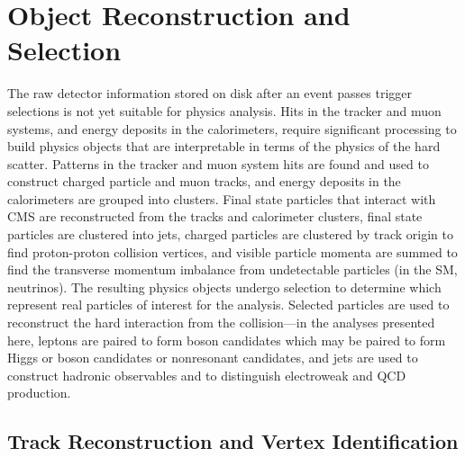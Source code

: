 
\chapter{Object Reconstruction and Selection}

The raw detector information stored on disk after an event passes trigger selections is not yet suitable for physics analysis.
Hits in the tracker and muon systems, and energy deposits in the calorimeters, require significant processing to build physics objects that are interpretable in terms of the physics of the hard scatter.
Patterns in the tracker and muon system hits are found and used to construct charged particle and muon tracks, and energy deposits in the calorimeters are grouped into clusters.
Final state particles that interact with CMS are reconstructed from the tracks and calorimeter clusters, final state particles are clustered into jets, charged particles are clustered by track origin to find proton-proton collision vertices, and visible particle momenta are summed to find the transverse momentum imbalance from undetectable particles (in the SM, neutrinos).
The resulting physics objects undergo selection to determine which represent real particles of interest for the analysis.
Selected particles are used to reconstruct the hard interaction from the collision---in the analyses presented here, leptons are paired to form {\Zgs} boson candidates which may be paired to form Higgs or {\PZ} boson candidates or nonresonant {\ZZ} candidates, and jets are used to construct hadronic observables and to distinguish electroweak and QCD {\ZZ} production.


\section{Track Reconstruction and Vertex Identification}\label{sec:trkVtxReco}

